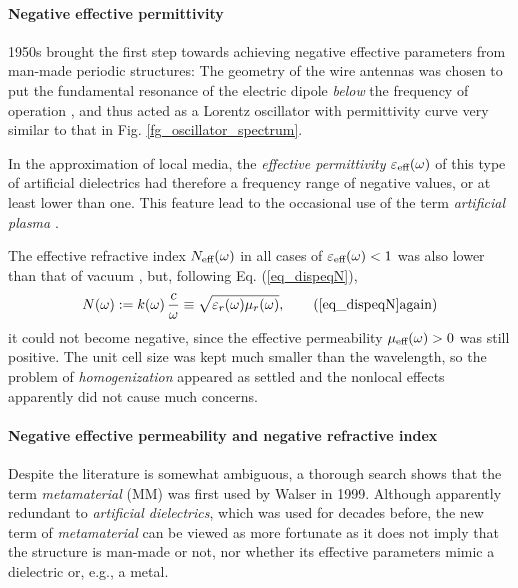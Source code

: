 \paragraph{Negative effective permittivity} %
1950s brought the first step towards achieving negative effective parameters from man-made periodic structures: The geometry of the wire antennas was chosen to put the fundamental resonance of the electric dipole \textit{below} the frequency of operation \cite{rotman1962plasma,boardman2005negative}, and thus acted as a Lorentz oscillator with permittivity curve very similar to that in Fig. \ref{fg_oscillator_spectrum}. 

In the approximation of local media, the \textit{effective permittivity} $\varepsilon_{\text{eff} }(\omega)$ of this type of artificial dielectrics had therefore a frequency range of negative values, or at least lower than one. This feature lead to the occasional use of the term \textit{artificial plasma} \cite{merkel1973simulation}. 

The effective refractive index $N_{\text{eff} }(\omega)$ in all cases of $\varepsilon_{\text{eff} }(\omega)<1$ was also lower than that of vacuum \cite{brown1953artificial}, but, following
Eq. (\ref{eq_dispeqN}), 
\begin{equation} N(\omega) := k(\omega) \, \frac{c}{\omega} \equiv \sqrt{\epsrl(\omega)\murl(\omega)}, \tag{\ref{eq_dispeqN}\again} \end{equation}
it could not become negative, since the effective permeability $\mu_{\text{eff} }(\omega) > 0$ was still positive. The unit cell size was kept much smaller than the wavelength, so the problem of \textit{homogenization} appeared as settled and the nonlocal effects apparently did not cause much concerns.

\paragraph{Negative effective permeability and negative refractive index}  %
Despite the literature is somewhat ambiguous, a thorough search shows that the term \textit{metamaterial} (MM) was first used by Walser in 1999. Although apparently redundant to \textit{artificial dielectrics}, which was used for decades before,  the new term of \textit{metamaterial} can be viewed as more fortunate as it does not imply that the structure is man-made or not, nor whether its effective parameters mimic a dielectric or, e.g., a metal.

